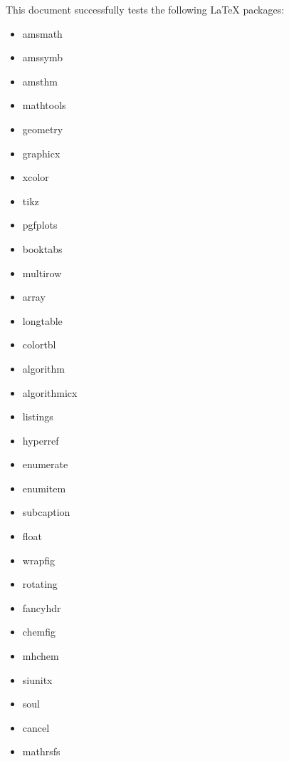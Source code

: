 \documentclass[11pt,a4paper]{article}
\theoremstyle{definition}
\begin{document}
This document successfully tests the following LaTeX packages:
\begin{multicols}{3}
\begin{itemize}[noitemsep]
    \item amsmath
    \item amssymb
    \item amsthm
    \item mathtools
    \item geometry
    \item graphicx
    \item xcolor
    \item tikz
    \item pgfplots
    \item booktabs
    \item multirow
    \item array
    \item longtable
    \item colortbl
    \item algorithm
    \item algorithmicx
    \item listings
    \item hyperref
    \item enumerate
    \item enumitem
    \item subcaption
    \item float
    \item wrapfig
    \item rotating
    \item fancyhdr
    \item chemfig
    \item mhchem
    \item siunitx
    \item soul
    \item cancel
    \item mathrsfs
\end{itemize}
\end{multicols}

\vspace{1cm}

\begin{center}
\end{center}
\end{document}

